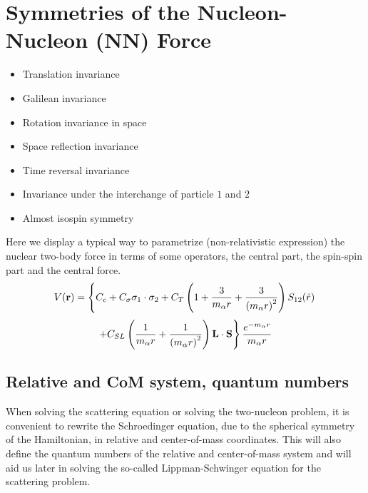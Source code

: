 \documentclass[graybox,sectrefs,envcountresetchap,open=right]{svmonodo}
\begin{document}
\noindent
\section{Symmetries of the Nucleon-Nucleon (NN) Force}

\begin{itemize}
\item Translation invariance

\item Galilean invariance

\item Rotation invariance in space

\item Space reflection invariance

\item Time reversal invariance

\item Invariance under the interchange of particle $1$ and $2$

\item Almost isospin symmetry
\end{itemize}

\noindent
Here we display a typical way to parametrize (non-relativistic expression) the nuclear two-body force
in terms of some operators, the central part, the spin-spin part and the central force.
\[
V(\mathbf{r})= \left\{ C_c + C_\mathbf{\sigma} \mathbf{\sigma}_1\cdot\mathbf{\sigma}_2
 + C_T \left( 1 + {3\over m_\alpha r} + {3\over\left(m_\alpha r\right)^2}\right) S_{12} (\hat r)\right. 
\]
\[
\left. + C_{SL} \left( {1\over m_\alpha r} + {1\over \left( m_\alpha r\right)^2}
\right) \mathbf{L}\cdot \mathbf{S}
\right\} \frac{e^{-m_\alpha r}}{m_\alpha r}
\]

\subsection{Relative and CoM system, quantum numbers}

When solving the scattering equation or solving the two-nucleon problem, it is convenient to rewrite the Schroedinger equation, due to
the spherical symmetry of the Hamiltonian, in relative and center-of-mass coordinates. This will also define the quantum numbers of the relative and center-of-mass system and will aid us later in solving
the so-called Lippman-Schwinger equation for the scattering problem. 
\end{document}

